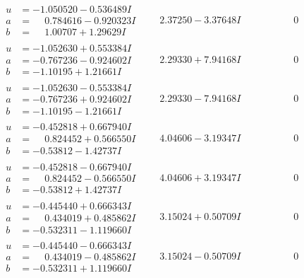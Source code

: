 \documentclass[1p]{elsarticle_modified}
\theoremstyle{definition}
\begin{document}
$$\begin{array}{c|c|c}
\begin{aligned}
u &= -1.050520 - 0.536489 I \\
a &= \phantom{-}0.784616 - 0.920323 I \\
b &= \phantom{-}1.00707 + 1.29629 I\end{aligned}
 & \phantom{-}2.37250 - 3.37648 I & \phantom{-0.000000 } 0 \\ \hline\begin{aligned}
u &= -1.052630 + 0.553384 I \\
a &= -0.767236 - 0.924602 I \\
b &= -1.10195 + 1.21661 I\end{aligned}
 & \phantom{-}2.29330 + 7.94168 I & \phantom{-0.000000 } 0 \\ \hline\begin{aligned}
u &= -1.052630 - 0.553384 I \\
a &= -0.767236 + 0.924602 I \\
b &= -1.10195 - 1.21661 I\end{aligned}
 & \phantom{-}2.29330 - 7.94168 I & \phantom{-0.000000 } 0 \\ \hline\begin{aligned}
u &= -0.452818 + 0.667940 I \\
a &= \phantom{-}0.824452 + 0.566550 I \\
b &= -0.53812 - 1.42737 I\end{aligned}
 & \phantom{-}4.04606 - 3.19347 I & \phantom{-0.000000 } 0 \\ \hline\begin{aligned}
u &= -0.452818 - 0.667940 I \\
a &= \phantom{-}0.824452 - 0.566550 I \\
b &= -0.53812 + 1.42737 I\end{aligned}
 & \phantom{-}4.04606 + 3.19347 I & \phantom{-0.000000 } 0 \\ \hline\begin{aligned}
u &= -0.445440 + 0.666343 I \\
a &= \phantom{-}0.434019 + 0.485862 I \\
b &= -0.532311 - 1.119660 I\end{aligned}
 & \phantom{-}3.15024 + 0.50709 I & \phantom{-0.000000 } 0 \\ \hline\begin{aligned}
u &= -0.445440 - 0.666343 I \\
a &= \phantom{-}0.434019 - 0.485862 I \\
b &= -0.532311 + 1.119660 I\end{aligned}
 & \phantom{-}3.15024 - 0.50709 I & \phantom{-0.000000 } 0 \\ \hline\begin{aligned}

\end{aligned}
\end{array}$$
\end{document}
